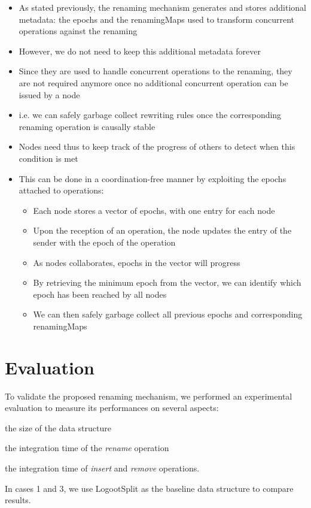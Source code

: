 \documentclass{article}
\theoremstyle{definition}
\begin{document}
\begin{itemize}
    \item As stated previously, the renaming mechanism generates and stores additional metadata: the epochs and the renamingMaps used to transform concurrent operations against the renaming
    \item However, we do not need to keep this additional metadata forever
    \item Since they are used to handle concurrent operations to the renaming, they are not required anymore once no additional concurrent operation can be issued by a node
    \item i.e. we can safely garbage collect rewriting rules once the corresponding renaming operation is causally stable \cite{10.1007/978-3-662-43352-2_11}
    \item Nodes need thus to keep track of the progress of others to detect when this condition is met
    \item This can be done in a coordination-free manner by exploiting the epochs attached to operations:
    \begin{itemize}
        \item Each node stores a vector of epochs, with one entry for each node
        \item Upon the reception of an operation, the node updates the entry of the sender with the epoch of the operation
        \item As nodes collaborates, epochs in the vector will progress
        \item By retrieving the minimum epoch from the vector, we can identify which epoch has been reached by all nodes
        \item We can then safely garbage collect all previous epochs and corresponding renamingMaps
    \end{itemize}
\end{itemize}

\section{Evaluation}

To validate the proposed renaming mechanism, we performed an experimental evaluation to measure its performances on several aspects:
\begin{enumerate*}
    \item the size of the data structure
    \item the integration time of the \emph{rename} operation
    \item the integration time of \emph{insert} and \emph{remove} operations.
\end{enumerate*} In cases 1 and 3, we use LogootSplit as the baseline data structure to compare results.
\end{document}
